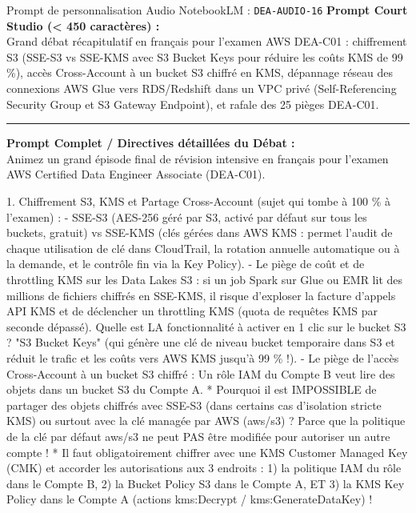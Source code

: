 \documentclass[11pt,a4paper]{article}
\begin{document}
\begin{promptbox}{Prompt de personnalisation Audio NotebookLM : \texttt{DEA-AUDIO-16}}
\textbf{Prompt Court Studio (< 450 caractères) :}\\
Grand débat récapitulatif en français pour l'examen AWS DEA-C01 : chiffrement S3 (SSE-S3 vs SSE-KMS avec S3 Bucket Keys pour réduire les coûts KMS de 99 \%), accès Cross-Account à un bucket S3 chiffré en KMS, dépannage réseau des connexions AWS Glue vers RDS/Redshift dans un VPC privé (Self-Referencing Security Group et S3 Gateway Endpoint), et rafale des 25 pièges DEA-C01.

\medskip\hrule\medskip
\textbf{Prompt Complet / Directives détaillées du Débat :}\\
Animez un grand épisode final de révision intensive en français pour l'examen AWS Certified Data Engineer Associate (DEA-C01).

1. Chiffrement S3, KMS et Partage Cross-Account (sujet qui tombe à 100 \% à l'examen) :
- SSE-S3 (AES-256 géré par S3, activé par défaut sur tous les buckets, gratuit) vs SSE-KMS (clés gérées dans AWS KMS : permet l'audit de chaque utilisation de clé dans CloudTrail, la rotation annuelle automatique ou à la demande, et le contrôle fin via la Key Policy).
- Le piège de coût et de throttling KMS sur les Data Lakes S3 : si un job Spark sur Glue ou EMR lit des millions de fichiers chiffrés en SSE-KMS, il risque d'exploser la facture d'appels API KMS et de déclencher un throttling KMS (quota de requêtes KMS par seconde dépassé). Quelle est LA fonctionnalité à activer en 1 clic sur le bucket S3 ? "S3 Bucket Keys" (qui génère une clé de niveau bucket temporaire dans S3 et réduit le trafic et les coûts vers AWS KMS jusqu'à 99 \% !).
- Le piège de l'accès Cross-Account à un bucket S3 chiffré :
  Un rôle IAM du Compte B veut lire des objets dans un bucket S3 du Compte A.
  * Pourquoi il est IMPOSSIBLE de partager des objets chiffrés avec SSE-S3 (dans certains cas d'isolation stricte KMS) ou surtout avec la clé managée par AWS (aws/s3) ? Parce que la politique de la clé par défaut aws/s3 ne peut PAS être modifiée pour autoriser un autre compte !
  * Il faut obligatoirement chiffrer avec une KMS Customer Managed Key (CMK) et accorder les autorisations aux 3 endroits : 1) la politique IAM du rôle dans le Compte B, 2) la Bucket Policy S3 dans le Compte A, ET 3) la KMS Key Policy dans le Compte A (actions kms:Decrypt / kms:GenerateDataKey) !


\end{promptbox}
\end{document}
